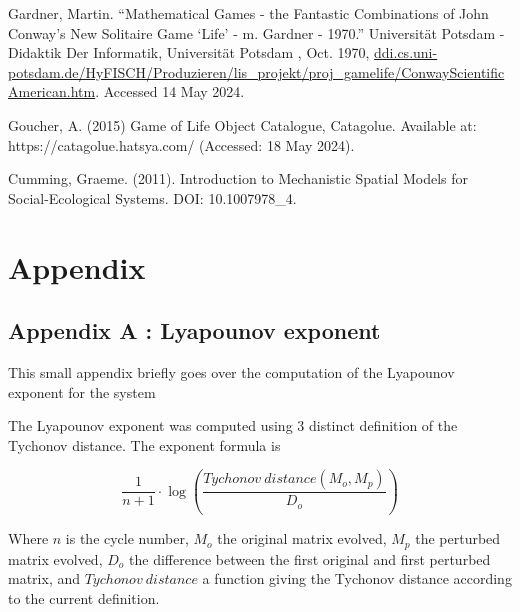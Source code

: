 \documentclass{article}
\begin{document}
\begin{thebibliography}{9}
    Gardner, Martin. “Mathematical Games - the Fantastic Combinations of John Conway’s New Solitaire Game ‘Life’ - m. Gardner - 1970.” Universität Potsdam - Didaktik Der Informatik, Universität Potsdam , Oct. 1970, \url{ddi.cs.uni-potsdam.de/HyFISCH/Produzieren/lis_projekt/proj_gamelife/ConwayScientificAmerican.htm}. Accessed 14 May 2024.

    Goucher, A. (2015) Game of Life Object Catalogue, Catagolue. Available at: https://catagolue.hatsya.com/ (Accessed: 18 May 2024). 

    Cumming, Graeme. (2011). Introduction to Mechanistic Spatial Models for Social-Ecological Systems. DOI: 10.1007\/978\_4.
\end{thebibliography}

\newpage


\section{Appendix}
\subsection*{Appendix A : Lyapounov exponent}
This small appendix briefly goes over the computation of the Lyapounov exponent for the system

\vspace{\baselineskip}

The Lyapounov exponent was computed using 3 distinct definition of the Tychonov 
distance. The exponent formula is 

\begin{equation}
    \frac{1}{{n+1}} \cdot \log\left(\frac{Tychonov\ distance(M_o, M_p)}{D_o}\right)
    \label{eq:Lyapounov}
\end{equation}

Where $n$ is the cycle number, $M_o$ the original matrix evolved, $M_p$ the perturbed matrix
evolved, $D_o$ the difference between the first original and first perturbed matrix, and $Tychonov\ distance$
a function giving the Tychonov distance according to the current definition. 
\end{document}
